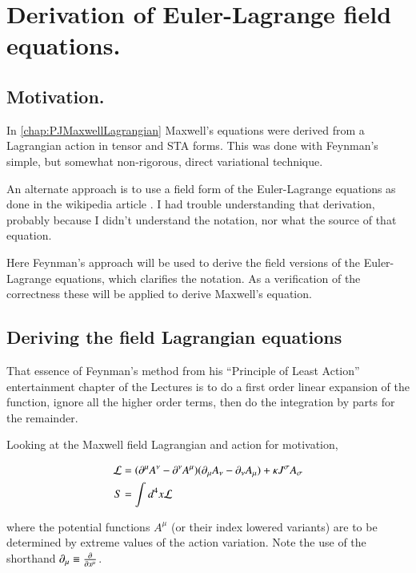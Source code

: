 \chapter{Derivation of Euler-Lagrange field equations.}\label{chap:PJFieldLagrangian}
\date{ October 10, 2008.  $RCSfile: fieldLagrangian.tex,v $ Last $Revision: 1.19 $ $Date: 2009/07/04 18:48:21 $ }

\section{Motivation. }

In \ref{chap:PJMaxwellLagrangian} Maxwell's equations were derived from
a Lagrangian action in tensor and STA forms.  This was done with 
Feynman's \cite{feynman1963flp} simple, but somewhat non-rigorous, direct variational technique.

An alternate approach is to use a field form of the Euler-Lagrange
equations as done in the wikipedia article \cite{wiki:emtensor}.  I had
trouble understanding that derivation, probably because
I didn't understand the notation, nor what the source of that equation.

Here Feynman's approach will be used to derive the field versions of the Euler-Lagrange
equations, which clarifies the notation.  As a verification of the correctness these
will be applied to derive Maxwell's equation.

\section{Deriving the field Lagrangian equations }

That essence of Feynman's method from his 
``Principle of Least Action'' entertainment chapter of the Lectures is
to do a first order linear expansion of the function, ignore all the higher order terms,
then do the integration by parts for the remainder.

Looking at the Maxwell field Lagrangian and action for motivation,

\begin{align*}
\mathcal{L} &= (\partial^\mu A^\nu - \partial^\nu A^\mu) (\partial_\mu A_\nu - \partial_\nu A_\mu) + \kappa J^\sigma A_\sigma \\
S &= \int d^4 x \mathcal{L}
\end{align*}

where the potential functions $A^\mu$ (or their index lowered variants)
are to be determined by extreme values of the action variation.  Note the use of the shorthand
$\partial_\mu \equiv \frac{\partial {}}{\partial {x^\mu}}$.

